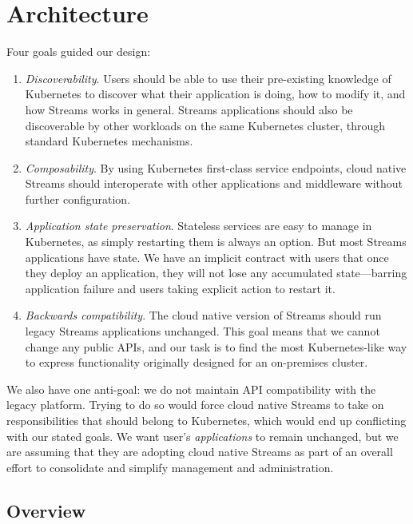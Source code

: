 \section{Architecture}
\label{sec:arch}
Four goals guided our design:

\begin{enumerate}
    \item \emph{Discoverability}. Users should be able to use their pre-existing 
        knowledge of Kubernetes to discover what their application is doing, how 
        to modify it, and how Streams works in general. Streams applications 
        should also be discoverable by other workloads on the same Kubernetes 
        cluster, through standard Kubernetes mechanisms.
    \item \emph{Composability}. By using Kubernetes first-class service
        endpoints, cloud native Streams should interoperate with other applications
        and middleware without further configuration. 
    \item \emph{Application state preservation}. Stateless services are easy to
        manage in Kubernetes, as simply restarting them is always an option.
        But most Streams applications have state. We have an implicit contract
        with users that once they deploy an application, they will not lose any
        accumulated state---barring application failure and users taking
        explicit action to restart it.
    \item \emph{Backwards compatibility}. The cloud native version of Streams 
        should run legacy Streams applications unchanged. This goal means that 
        we cannot change any public APIs, and our task is to find the most 
        Kubernetes-like way to express functionality originally designed 
        for an on-premises cluster.
\end{enumerate}

We also have one anti-goal: we do not maintain API compatibility with the legacy
platform. Trying to do so would force cloud native Streams to take on
responsibilities that should belong to Kubernetes, which would end up
conflicting with our stated goals. We want user's \emph{applications} to remain
unchanged, but we are assuming that they are adopting cloud native Streams as
part of an overall effort to consolidate and simplify management and
administration.

\subsection{Overview}

